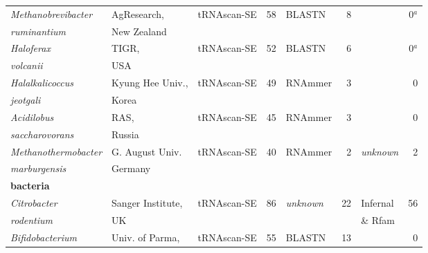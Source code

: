 \begin{table}
\begin{tabular}{|ll|lr|lr|lr|}
\noalign{\smallskip}\svhline\noalign{\smallskip}
\multicolumn{8}{l}{\textbf{archaea}} \\ \hline
\emph{Methanobrevibacter}                & AgResearch,       & tRNAscan-SE   & 58       & BLASTN         & 8  &                & 0$^a$    \\
\emph{ruminantium} \cite{Leahy10}        & New Zealand       &               &          &                &    &                &          \\ \hline
\emph{Haloferax}                         & TIGR,             & tRNAscan-SE   & 52       & BLASTN         & 6  &                & 0$^a$    \\
\emph{volcanii} \cite{Hartman10}         & USA               &               &          &                &    &                &          \\  \hline %
\emph{Halalkalicoccus}                   & Kyung Hee Univ.,  & tRNAscan-SE   & 49       & RNAmmer        & 3  &                & 0        \\
\emph{jeotgali} \cite{Roh10}             & Korea             &               &          &                &    &                &          \\ \hline
\emph{Acidilobus}                        & RAS,              & tRNAscan-SE   & 45       & RNAmmer        & 3  &                & 0        \\
\emph{saccharovorans} \cite{Mardonov10}  & Russia            &               &          &                &    &                &          \\ \hline
\emph{Methanothermobacter}               & G. August Univ.   & tRNAscan-SE   & 40       & RNAmmer        & 2  & \emph{unknown} &  2       \\
\emph{marburgensis} \cite{Liesegang10}   & Germany           &               &          &                &    &                &          \\ \hline %
\multicolumn{8}{l}{\textbf{bacteria}} \\ \hline
\emph{Citrobacter}                       & Sanger Institute, & tRNAscan-SE   & 86       & \emph{unknown} & 22 & Infernal       & 56       \\
\emph{rodentium} \cite{Petty10}          & UK                &               &          &                &    & \& Rfam        &          \\ \hline
\emph{Bifidobacterium}                   & Univ. of Parma,   & tRNAscan-SE   & 55       & BLASTN         & 13 &                &  0       \\

\end{tabular}
\end{table}
